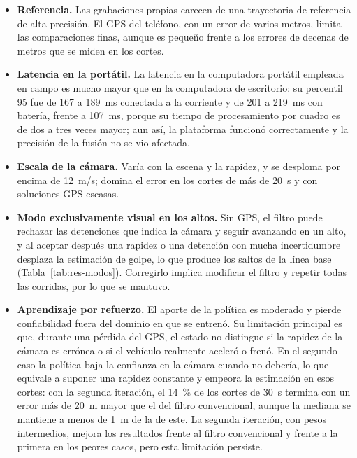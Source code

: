 \begin{itemize}
\item \textbf{Referencia.} Las grabaciones propias carecen de una trayectoria de referencia de alta precisión.
El GPS del teléfono, con un error de varios metros, limita las comparaciones finas, aunque es pequeño frente a los errores de decenas de metros que se miden en los cortes.
\item \textbf{Latencia en la portátil.} La latencia en la computadora portátil empleada en campo es mucho mayor que en la computadora de escritorio: su percentil 95 fue de 167 a 189~ms conectada a la corriente y de 201 a 219~ms con batería, frente a 107~ms, porque su tiempo de procesamiento por cuadro es de dos a tres veces mayor; aun así, la plataforma funcionó correctamente y la precisión de la fusión no se vio afectada.
\item \textbf{Escala de la cámara.} Varía con la escena y la rapidez, y se desploma por encima de 12~m/s; domina el error en los cortes de más de 20~s y con soluciones GPS escasas.
\item \textbf{Modo exclusivamente visual en los altos.} Sin GPS, el filtro puede rechazar las detenciones que indica la cámara y seguir avanzando en un alto, y al aceptar después una rapidez o una detención con mucha incertidumbre desplaza la estimación de golpe, lo que produce los saltos de la línea base (Tabla~\ref{tab:res-modos}).
Corregirlo implica modificar el filtro y repetir todas las corridas, por lo que se mantuvo.
\item \textbf{Aprendizaje por refuerzo.} El aporte de la política es moderado y pierde confiabilidad fuera del dominio en que se entrenó.
Su limitación principal es que, durante una pérdida del GPS, el estado no distingue si la rapidez de la cámara es errónea o si el vehículo realmente aceleró o frenó.
En el segundo caso la política baja la confianza en la cámara cuando no debería, lo que equivale a suponer una rapidez constante y empeora la estimación en esos cortes: con la segunda iteración, el 14~\% de los cortes de 30~s termina con un error más de 20~m mayor que el del filtro convencional, aunque la mediana se mantiene a menos de 1~m de la de este.
La segunda iteración, con pesos intermedios, mejora los resultados frente al filtro convencional y frente a la primera en los peores casos, pero esta limitación persiste.
\end{itemize}

